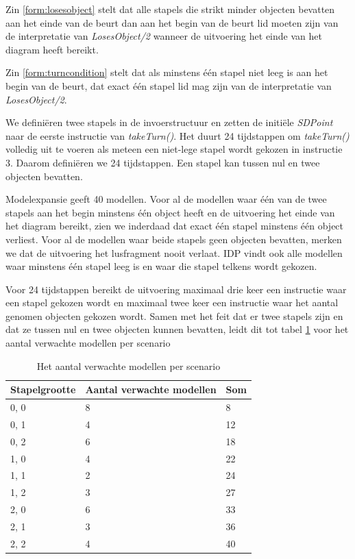 Zin \ref{form:losesobject} stelt dat alle stapels die strikt minder objecten bevatten aan het einde van de beurt dan aan het begin van de beurt lid moeten zijn van de interpretatie van \textit{LosesObject/2} wanneer de uitvoering het einde van het diagram heeft bereikt.

Zin \ref{form:turncondition} stelt dat als minstens \'e\'en stapel niet leeg is aan het begin van de beurt, dat exact \'e\'en stapel lid mag zijn van de interpretatie van \textit{LosesObject/2}.

We defini\"eren twee stapels in de invoerstructuur en zetten de initi\"ele \textit{SDPoint} naar de eerste instructie van \textit{takeTurn()}. Het duurt 24 tijdstappen om \textit{takeTurn()} volledig uit te voeren als meteen een niet-lege stapel wordt gekozen in instructie 3. Daarom defini\"eren we 24 tijdstappen. Een stapel kan tussen nul en twee objecten bevatten.

Modelexpansie geeft 40 modellen. Voor al de modellen waar \'e\'en van de twee stapels aan het begin minstens \'e\'en object heeft en de uitvoering het einde van het diagram bereikt, zien we inderdaad dat exact \'e\'en stapel minstens \'e\'en object verliest. Voor al de modellen waar beide stapels geen objecten bevatten, merken we dat de uitvoering het lusfragment nooit verlaat. IDP vindt ook alle modellen waar minstens \'e\'en stapel leeg is en waar die stapel telkens wordt gekozen. 

Voor 24 tijdstappen bereikt de uitvoering maximaal drie keer een instructie waar een stapel gekozen wordt en maximaal twee keer een instructie waar het aantal genomen objecten gekozen wordt. Samen met het feit dat er twee stapels zijn en dat ze tussen nul en twee objecten kunnen bevatten, leidt dit tot tabel \ref{tbl:exp-models} voor het aantal verwachte modellen per scenario

\begin{table}[]
	\centering
	\begin{tabular}{|l|l|l|}
\hline
Stapelgrootte & Aantal verwachte modellen & Som \\ \hline
0, 0          & 8                         & 8   \\ \hline
0, 1          & 4                         & 12  \\ \hline
0, 2          & 6                         & 18  \\ \hline
1, 0          & 4                         & 22  \\ \hline
1, 1          & 2                         & 24  \\ \hline
1, 2          & 3                         & 27  \\ \hline
2, 0          & 6                         & 33  \\ \hline
2, 1          & 3                         & 36  \\ \hline
2, 2          & 4                         & 40  \\ \hline
\end{tabular}
	\caption{Het aantal verwachte modellen per scenario}
	\label{tbl:exp-models}
\end{table}

